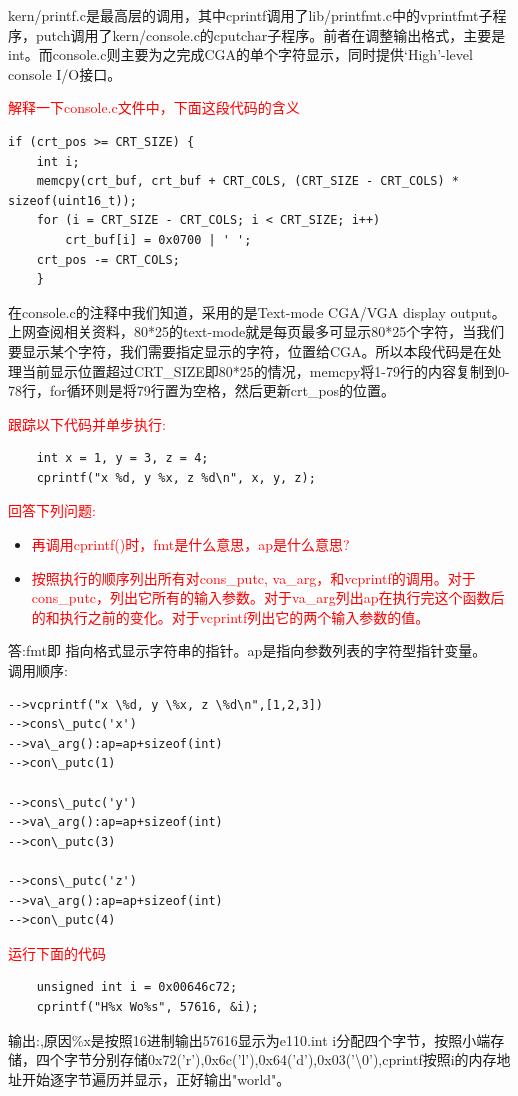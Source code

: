\documentclass[]{ctexrep}
\begin{document}
	kern/printf.c是最高层的调用，其中cprintf调用了lib/printfmt.c中的vprintfmt子程序，putch调用了kern/console.c的cputchar子程序。前者在调整输出格式，主要是int。而console.c则主要为之完成CGA的单个字符显示，同时提供‘High'-level console I/O接口。
	
	\textcolor{red}{解释一下console.c文件中，下面这段代码的含义}
	\begin{lstlisting}
if (crt_pos >= CRT_SIZE) {
    int i;
    memcpy(crt_buf, crt_buf + CRT_COLS, (CRT_SIZE - CRT_COLS) * sizeof(uint16_t));
    for (i = CRT_SIZE - CRT_COLS; i < CRT_SIZE; i++)
        crt_buf[i] = 0x0700 | ' ';
    crt_pos -= CRT_COLS;
    }
	\end{lstlisting}
	
	在console.c的注释中我们知道，采用的是Text-mode CGA/VGA display output。上网查阅相关资料，80*25的text-mode就是每页最多可显示80*25个字符，当我们要显示某个字符，我们需要指定显示的字符，位置给CGA。所以本段代码是在处理当前显示位置超过CRT\_SIZE即80*25的情况，memcpy将1-79行的内容复制到0-78行，for循环则是将79行置为空格，然后更新crt\_pos的位置。
	
	\textcolor{red}{跟踪以下代码并单步执行:}
	\begin{lstlisting}
	int x = 1, y = 3, z = 4;
	cprintf("x %d, y %x, z %d\n", x, y, z);
	\end{lstlisting}
	\textcolor{red}{回答下列问题:}
	\begin{itemize}
		\item \textcolor{red}{再调用cprintf()时，fmt是什么意思，ap是什么意思?}
		\item \textcolor{red}{按照执行的顺序列出所有对cons\_putc, va\_arg，和vcprintf的调用。对于cons\_putc，列出它所有的输入参数。对于va\_arg列出ap在执行完这个函数后的和执行之前的变化。对于vcprintf列出它的两个输入参数的值。}
	\end{itemize}
	答:fmt即 指向格式显示字符串的指针。ap是指向参数列表的字符型指针变量。\\
	调用顺序:
	\begin{lstlisting}
-->vcprintf("x \%d, y \%x, z \%d\n",[1,2,3])
-->cons\_putc('x')
-->va\_arg():ap=ap+sizeof(int)
-->con\_putc(1)

-->cons\_putc('y')
-->va\_arg():ap=ap+sizeof(int)
-->con\_putc(3)

-->cons\_putc('z')
-->va\_arg():ap=ap+sizeof(int)
-->con\_putc(4)

	\end{lstlisting}
	
	\textcolor{red}{运行下面的代码}
	\begin{lstlisting}
	unsigned int i = 0x00646c72;
	cprintf("H%x Wo%s", 57616, &i);
	\end{lstlisting}
	\par
	输出:,原因\%x是按照16进制输出57616显示为e110.int i分配四个字节，按照小端存储，四个字节分别存储0x72('r'),0x6c('l'),0x64('d'),0x03('\textbackslash0'),cprintf按照i的内存地址开始逐字节遍历并显示，正好输出"world"。
	
\end{document}

